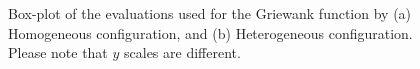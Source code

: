 \documentclass[conference]{IEEEtran}
\begin{document}
\begin{figure}[t]
    \centering
      \caption{Box-plot of the
        evaluations used for the Griewank function by (a) Homogeneous configuration, and (b)
        Heterogeneous configuration. Please note that $y$ scales are different.}
    \label{fig:griewank-evals}
\end{figure}
%
\end{document}
